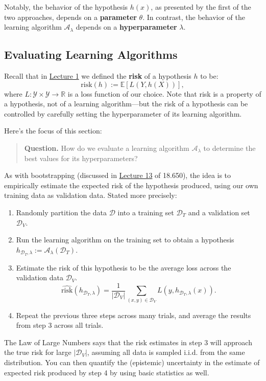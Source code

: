 Notably, the behavior of the hypothesis $h(x)$,
as presented by the first of the two approaches,
depends on a \textbf{parameter} $\theta$.
In contrast, the behavior of the
learning algorithm $\mathcal{A}_{\lambda}$
depends on a \textbf{hyperparameter} $\lambda$.

\subsection{Evaluating Learning Algorithms}

Recall that in
\href{/6.790/lectures/1/#the-optimal-hypothesis-given-the-distribution}{Lecture 1}
we defined the \textbf{risk}
of a hypothesis $h$ to be:
\[ \mathrm{risk}(h) := \mathbb{E}\left[L(Y, h(X))\right], \]
where $L \colon \mathcal{Y} \times \mathcal{Y} \to \mathbb{R}$
is a loss function of our choice.
Note that risk is a property of a hypothesis,
not of a learning algorithm---but
the risk of a hypothesis
can be controlled by carefully setting the
hyperparameter of its learning algorithm.

Here's the focus of this section:

\begin{quote}
    \textbf{Question.} How do we evaluate
    a learning algorithm $\mathcal{A}_{\lambda}$
    to determine the best values
    for its hyperparameters?
\end{quote}

As with bootstrapping (discussed in
\href{/18.650/lectures/13/#bootstrapping}{Lecture 13} of 18.650),
the idea is to empirically estimate
the expected risk of the hypothesis produced,
using our own training data as validation data.
Stated more precisely:
\begin{enumerate}
    \item Randomly partition the data $\mathcal{D}$
    into a training set $\mathcal{D}_T$
    and a validation set $\mathcal{D}_V$.
    \item Run the learning algorithm on the training set
    to obtain a hypothesis
    $h_{\mathcal{D}_T, \lambda} := \mathcal{A}_{\lambda}(\mathcal{D}_T)$.
    \item Estimate the risk of this hypothesis
    to be the average loss across the validation data $\mathcal{D}_V$.
    \[ \widehat{\mathrm{risk}}(h_{\mathcal{D}_T, \lambda})
    = \frac{1}{|\mathcal{D}_V|} \sum_{(x, y) \in \mathcal{D}_V}
    L(y, h_{\mathcal{D}_T, \lambda}(x)). \]
    \item Repeat the previous three steps across many trials,
    and average the results from step 3 across all trials.
\end{enumerate}
The Law of Large Numbers says that
the risk estimates in step 3
will approach the true risk for large $|\mathcal{D}_V|$,
assuming all data is sampled i.i.d. from the same distribution.
You can then quantify the (epistemic) uncertainty
in the estimate of expected risk produced by step 4 by using
basic statistics as well.

